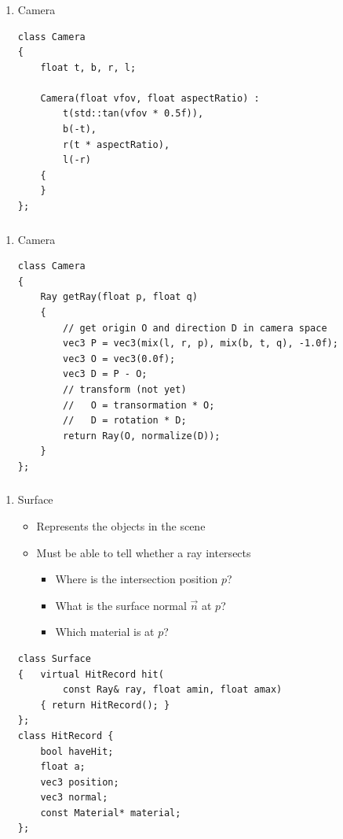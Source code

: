 \documentclass[utf8,stillsansserifmath,fleqn,t]{beamer}
\newcommand{\labelname}[1]{\def\insertenumlabel{#1}\usebeamertemplate{enumerate item}}
\begin{document}
\begin{frame}[fragile]
\frametitle{\insertsection}
\begin{enumerate}
\item[\labelname{2}] Camera
\begin{lstlisting}
class Camera
{
    float t, b, r, l;

    Camera(float vfov, float aspectRatio) :
        t(std::tan(vfov * 0.5f)),
        b(-t),
        r(t * aspectRatio),
        l(-r)
    {
    }
};
\end{lstlisting}
\end{enumerate}
\end{frame}

\begin{frame}[fragile]
\frametitle{\insertsection}
\begin{enumerate}
\item[\labelname{2}] Camera
\begin{lstlisting}
class Camera
{
    Ray getRay(float p, float q)
    {
        // get origin O and direction D in camera space
        vec3 P = vec3(mix(l, r, p), mix(b, t, q), -1.0f);
        vec3 O = vec3(0.0f);
        vec3 D = P - O;
        // transform (not yet)
        //   O = transormation * O;
        //   D = rotation * D;
        return Ray(O, normalize(D));
    }
};
\end{lstlisting}
\end{enumerate}
\end{frame}

\begin{frame}[fragile]
\frametitle{\insertsection}
\begin{enumerate}
\item[\labelname{3}] Surface
\begin{itemize}
\item Represents the objects in the scene
\item Must be able to tell whether a ray intersects
    \begin{itemize}
    \item Where is the intersection position $p$?
    \item What is the surface normal $\vec{n}$ at $p$?
    \item Which material is at $p$?
    \end{itemize}
\end{itemize}
\begin{lstlisting}
class Surface
{   virtual HitRecord hit(
        const Ray& ray, float amin, float amax)
    { return HitRecord(); }
};
class HitRecord {
    bool haveHit;
    float a;
    vec3 position;
    vec3 normal;
    const Material* material;
};
\end{lstlisting}
\end{enumerate}
\end{frame}
\end{document}
